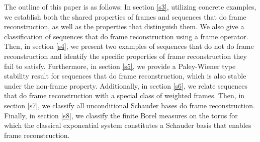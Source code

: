 \documentclass[11pt]{amsart}
\theoremstyle{definition}
\numberwithin{equation}{section}
\begin{document}
The outline of this paper is as follows: In section \ref{s3}, utilizing concrete examples, we establish both the shared properties of frames and sequences that do frame reconstruction, as well as the properties that distinguish them. We also give a classification of sequences that do frame reconstruction using a frame operator. Then, in section \ref{s4}, we present two examples of sequences that do not do frame reconstruction and identify the specific properties of frame reconstruction they fail to satisfy. Furthermore, in section \ref{s5}, we provide a Paley-Wiener type stability result for sequences that do frame reconstruction, which is also stable under the non-frame property. Additionally, in section \ref{s6}, we relate sequences that do frame reconstruction with a special class of weighted frames. Then, in section \ref{s7}, we classify all unconditional Schauder bases do frame reconstruction. Finally, in section \ref{s8}, we classify the finite Borel measures on the torus for which the classical exponential system constitutes a Schauder basis that enables frame reconstruction.
\end{document}
